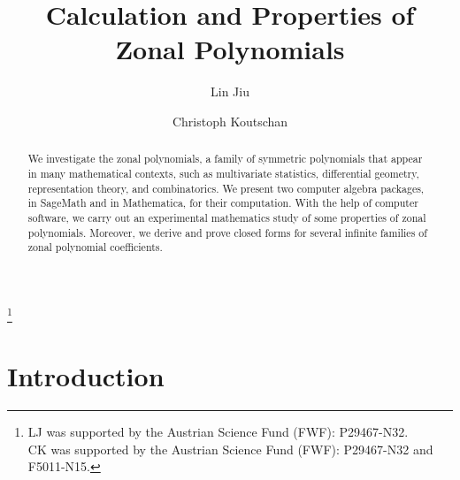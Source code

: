 \documentclass{mathincs}
\numberwithin{equation}{section}
\numberwithin{figure}{section}
\theoremstyle{plain}
\theoremstyle{definition}
\theoremstyle{remark}
\theoremstyle{plain}
\theoremstyle{definition}
\theoremstyle{plain}
\theoremstyle{plain}
\begin{document}
\title{Calculation and Properties of Zonal Polynomials}

\author{Lin Jiu}
\address{%
Department of Mathematics and Statistics,
Dalhousie University,
6316 Coburg Road, Halifax, Nova Scotia, Canada B3H 4R2 
}
\thanks{%
LJ was supported by the Austrian Science Fund (FWF): P29467-N32.\\
CK was supported by the Austrian Science Fund (FWF): P29467-N32 and F5011-N15.
}

\author{Christoph Koutschan}
\address{%
Johann Radon Institute for Computational and Applied Mathematics (RICAM),
Austrian Academy of Sciences,
Altenberger Stra\ss e 69, A-4040 Linz, Austria
}




\begin{abstract}
  We investigate the zonal polynomials, a family of symmetric polynomials that
  appear in many mathematical contexts, such as multivariate statistics,
  differential geometry, representation theory, and combinatorics.  We present
  two computer algebra packages, in SageMath and in Mathematica, for their
  computation. With the help of computer software, we carry out an experimental
  mathematics study of some properties of zonal polynomials. Moreover, we
  derive and prove closed forms for several infinite families of zonal
  polynomial coefficients.
\end{abstract}

\maketitle

\section{Introduction}
\end{document}
